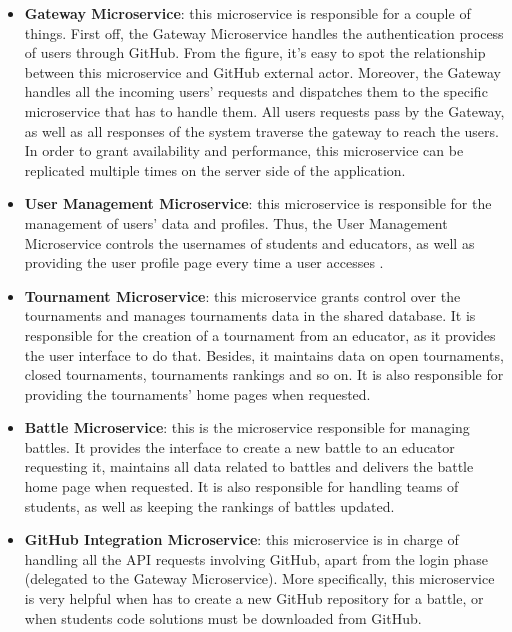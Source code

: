 \begin{itemize}
	\item \textbf{Gateway Microservice}: this microservice is responsible for a couple of things. First off, the Gateway Microservice handles the authentication process of users through GitHub. From the figure, it's easy to spot the relationship between this microservice and GitHub external actor. Moreover, the Gateway handles all the incoming users' requests and dispatches them to the specific microservice that has to handle them. All users requests pass by the Gateway, as well as all responses of the system traverse the gateway to reach the users. In order to grant availability and performance, this microservice can be replicated multiple times on the server side of the application.
    \item \textbf{User Management Microservice}: this microservice is responsible for the management of users' data and profiles. Thus, the User Management Microservice controls the usernames of students and educators, as well as providing the user profile page every time a user accesses \app.
    
    \item \textbf{Tournament Microservice}: this microservice grants control over the tournaments and manages tournaments data in the shared database. It is responsible for the creation of a tournament from an educator, as it provides the user interface to do that. Besides, it maintains data on open tournaments, closed tournaments, tournaments rankings and so on. It is also responsible for providing the tournaments' home pages when requested.
    
    \item \textbf{Battle Microservice}: this is the microservice responsible for managing battles. It provides the interface to create a new battle to an educator requesting it, maintains all data related to battles and delivers the battle home page when requested. It is also responsible for handling teams of students, as well as keeping the rankings of battles updated.
    
    \item \textbf{GitHub Integration Microservice}: this microservice is in charge of handling all the API requests involving GitHub, apart from the login phase (delegated to the Gateway Microservice). More specifically, this microservice is very helpful when \app has to create a new GitHub repository for a battle, or when students code solutions must be downloaded from GitHub.
    

\end{itemize}
